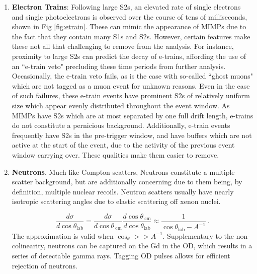 \begin{enumerate}
    \item \textbf{Electron Trains}: Following large S2s, an elevated rate of single electrons and single photoelectrons is observed over the course of  tens of  milliseconds, shown in Fig \ref{fig:etrain}.
    These can mimic the appearance of MIMPs due to the fact that they contain many S1s and S2s.
    However, certain features make these not all that challenging to remove from the analysis. 
    For instance, proximity to large S2s can predict the decay of e-trains, affording the use of an ``e-train veto" precluding these time periods from further analysis.
    Occasionally, the e-train veto fails, as is the case with so-called ``ghost muons" which are not tagged as a muon event for unknown reasons.
    Even in the case of such failures, these e-train events have prominent S2s of relatively uniform size which appear evenly distributed throughout the event window.
    As MIMPs have S2s which are at most separated by one full drift length, e-trains do not constitute a pernicious background.
    Additionally, e-train events frequently have S2s in the pre-trigger window, and have buffers which are not active at the start of the event, due to the activity of the previous event window carrying over.
    These qualities make them easier to remove.
    
    \item \textbf{Neutrons}. Much like Compton scatters, Neutrons constitute a multiple scatter background, but are additionally concerning due to them being, by definition, multiple nuclear recoils.
    Neutron scatters usually have nearly isotropic scattering angles due to elastic scattering off xenon nuclei.
    
    \begin{equation}
        \frac{d \sigma}{d \cos \theta_{\text{lab}}} = \frac{d \sigma}{d \cos \theta_{\mathrm{~cm}}} \frac{d \cos \theta_{\mathrm{~cm}}}{d \cos \theta_{\text{lab}}} \approx \frac{1}{\cos \theta_{\text{lab}} - A^{-1}}~.
    \end{equation}
    \noindent
    The approximation is valid when $\cos_\theta >>A^{-1}$.
    Supplementary to the non-colinearity, neutrons can be captured on the Gd in the OD, which results in a series of detectable gamma rays.
    Tagging OD pulses allows for efficient rejection of neutrons.
    

\end{enumerate}
